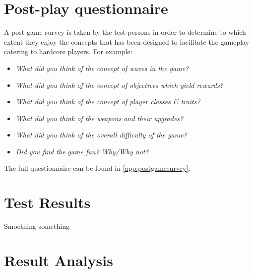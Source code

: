 \section{Post-play questionnaire}
A post-game survey is taken by the test-persons in order to determine to which extent they enjoy the concepts that has been designed to facilitate the gameplay catering to hardcore players.
For example:
\begin{itemize}
\item \emph{What did you think of the concept of waves in the game?}
\item \emph{What did you think of the concept of objectives which yield rewards?}
\item \emph{What did you think of the concept of player classes & traits?}
\item \emph{What did you think of the weapons and their upgrades?}
\item \emph{What did you think of the overall difficulty of the game?}
\item \emph{Did you find the game fun? Why/Why not?}
\end{itemize}
The full questionnaire can be found in \ref{app:postgamesurvey}.

\section{Test Results}
Smoething something

\section{Result Analysis}